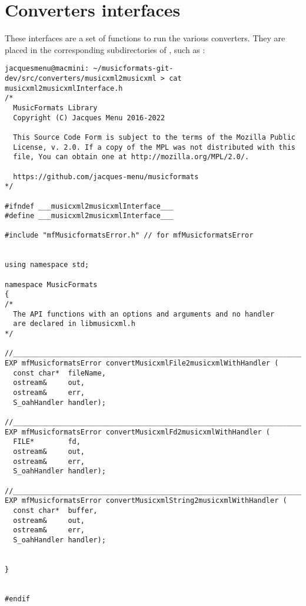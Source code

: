 
\chapter{Converters interfaces}

These interfaces are a set of functions to run the various converters. They are placed in the corresponding subdirectories of \converters, such as :
\begin{lstlisting}[language=Terminal]
jacquesmenu@macmini: ~/musicformats-git-dev/src/converters/musicxml2musicxml > cat musicxml2musicxmlInterface.h
/*
  MusicFormats Library
  Copyright (C) Jacques Menu 2016-2022

  This Source Code Form is subject to the terms of the Mozilla Public
  License, v. 2.0. If a copy of the MPL was not distributed with this
  file, You can obtain one at http://mozilla.org/MPL/2.0/.

  https://github.com/jacques-menu/musicformats
*/

#ifndef ___musicxml2musicxmlInterface___
#define ___musicxml2musicxmlInterface___

#include "mfMusicformatsError.h" // for mfMusicformatsError


using namespace std;

namespace MusicFormats
{
/*
  The API functions with an options and arguments and no handler
  are declared in libmusicxml.h
*/

//_______________________________________________________________________________
EXP mfMusicformatsError convertMusicxmlFile2musicxmlWithHandler (
  const char*  fileName,
  ostream&     out,
  ostream&     err,
  S_oahHandler handler);

//_______________________________________________________________________________
EXP mfMusicformatsError convertMusicxmlFd2musicxmlWithHandler (
  FILE*        fd,
  ostream&     out,
  ostream&     err,
  S_oahHandler handler);

//_______________________________________________________________________________
EXP mfMusicformatsError convertMusicxmlString2musicxmlWithHandler (
  const char*  buffer,
  ostream&     out,
  ostream&     err,
  S_oahHandler handler);


}


#endif
\end{lstlisting}


